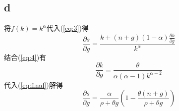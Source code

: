 \documentclass[a4paper,12pt]{ctexart}
\begin{document}
\subsection*{d}
将$f(k)=k^\alpha$代入(\ref{eq:3})得
\begin{equation}\label{eq:final}
    \frac{\partial s}{\partial g}=\frac{k+(n+g)(1-\alpha)\frac{\partial k}{\partial g}}{k^\alpha}
\end{equation}
结合(\ref{eq:4})有
\begin{equation*}
    \frac{\partial{k}}{\partial{g}}=\frac{\theta}{\alpha(\alpha-1)k^{\alpha-2}}
\end{equation*}
代入(\ref{eq:final})解得
\begin{equation}
    \frac{\partial s}{\partial g}=\frac{\alpha}{\rho+\theta g}\left(1-\frac{\theta(n+g)}{\rho+\theta g}\right)
\end{equation}
\end{document}
